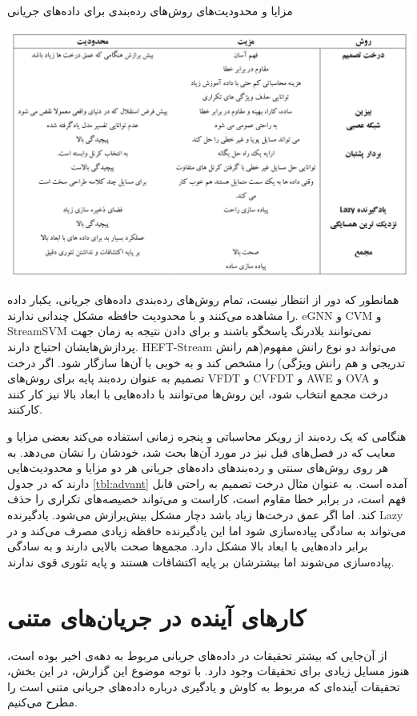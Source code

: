 \begin{table}
  \caption{مزایا و محدودیت‌های روش‌های رده‌بندی برای داده‌های جریانی}
  \label{tbl:advant}
  \includegraphics[width=\linewidth]{advant}
\end{table}
همانطور که دور از انتظار نیست، تمام روش‌های رده‌بندی داده‌های جریانی، یکبار داده‌ را مشاهده می‌کنند و با محدودیت حافظه مشکل چندانی ندارند. eGNN و CVM و StreamSVM نمی‌توانند بلادرنگ پاسخگو باشند و برای دادن نتیجه به زمان جهت پردازش‌هایشان احتیاج دارند. HEFT-Stream می‌تواند دو نوع رانش‌ مفهوم(هم رانش تدریجی و هم رانش ویژگی) را مشخص کند و به خوبی با آن‌ها سازگار شود. اگر درخت تصمیم به عنوان رده‌بند پایه برای روش‌های VFDT و CVFDT و AWE و OVA و درخت مجمع انتخاب شود، این روش‌ها می‌توانند با داده‌هایی با ابعاد بالا نیز کار کنند کارکنند. 

هنگامی که یک رده‌بند از رویکر محاسباتی و پنجره زمانی استفاده می‌کند بعضی مزایا و معایب که در فصل‌های قبل نیز در مورد آن‌ها بحث شد، خودشان را نشان می‌دهد. به هر روی روش‌های سنتی و رده‌بندهای داده‌های جریانی هر دو مزایا و محدودیت‌هایی دارند که در جدول
\ref{tbl:advant}
آمده است. به عنوان مثال درخت تصمیم به راحتی قابل فهم است، در برابر خطا مقاوم است، کاراست و می‌تواند خصیصه‌های تکراری را حذف کند. اما اگر عمق درخت‌ها زیاد باشد دچار مشکل بیش‌برازش
می‌شود. یادگیرنده Lazy می‌تواند به سادگی پیاده‌سازی شود اما این یادگیرنده حافظه زیادی مصرف می‌کند و در برابر داده‌هایی با ابعاد بالا مشکل دارد. مجمع‌ها صحت بالایی دارند و به سادگی پیاده‌سازی می‌شوند اما بیشترشان بر پایه اکتشافات هستند و پایه تئوری قوی ندارند.


\section{کارهای آینده در جریان‌های متنی}
از آن‌جایی که بیشتر تحقیقات در داده‌های جریانی مربوط به دهه‌ی اخیر بوده است، هنوز مسایل زیادی برای تحقیقات وجود دارد\cite{Nguyen2015}. با توجه موضوع این گزارش، در این بخش، تحقیقات آینده‌ای که مربوط به کاوش و یادگیری درباره داده‌های جریانی متنی است را مطرح می‌کنیم.

